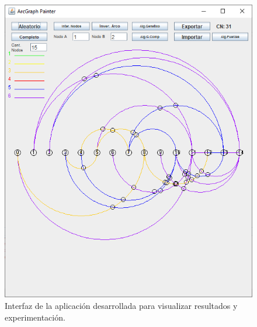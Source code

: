 \begin{figure}
		\centering
		\includegraphics[scale=0.7]{imagenes/aplicacion.png}
		\caption{Interfaz de la aplicación desarrollada para visualizar resultados y experimentación.}
		\label{fig1:aplicacion}
	\end{figure}
	
